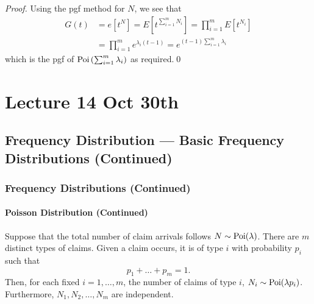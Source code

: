 \documentclass[notoc,notitlepage]{tufte-book}
\begin{document}
\begin{proof}
  Using the pgf method for $N$, we see that
  \begin{align*}
    G(t) &= e\left[ t^N \right] = E\left[ t^{\sum_{i=1}^{m} N_i} \right] = \prod_{i=1}^{m} E\left[t^{N_i}\right] \\
         &= \prod_{i=1}^{m} e^{\lambda_i ( t - 1 )} = e^{( t - 1 ) \sum_{i=1}^{m} \lambda_i}
  \end{align*}
  which is the pgf of $\operatorname{Poi}\left( \sum_{i=1}^{m} \lambda_i \right)$ as required.\qed\
\end{proof}





\chapter{Lecture 14 Oct 30th}%
\label{chp:lecture_14_oct_30th}

\section{Frequency Distribution --- Basic Frequency Distributions (Continued)}%
\label{sec:frequency_distribution_basic_frequency_distributions_continued}

\subsection{Frequency Distributions (Continued)}%
\label{sub:frequency_distributions_continued}

\subsubsection{Poisson Distribution (Continued)}%
\label{ssub:poisson_distribution_continued}

\begin{propo}\label{propo:splitting_a_poisson_distribution}
  Suppose that the total number of claim arrivals follows $N \sim \operatorname{Poi}(\lambda)$. There are $m$ distinct types of claims. Given a claim occurs, it is of type $i$ with probability $p_i$ such that
  \begin{equation*}
    p_1 + \hdots + p_m = 1.
  \end{equation*}
  Then, for each fixed $i = 1, \ldots, m$, the number of claims of type $i$, $N_i \sim \operatorname{Poi}(\lambda p_i)$. Furthermore, $N_1, N_2, \ldots, N_m$ are independent.
\end{propo}
\end{document}
